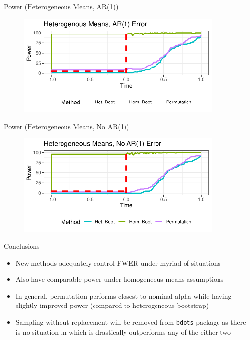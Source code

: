 \documentclass{beamer}
\newcommand{\xt}{\texttt}
\begin{document}
\begin{frame}{Power (Heterogeneous Means, AR(1))}
\begin{figure}
\centering
\includegraphics[width=0.9\textwidth]{type_two_error_time_b.pdf}
\end{figure}
\end{frame}


\begin{frame}{Power (Heterogeneous Means, No AR(1))}
\begin{figure}
\centering
\includegraphics[width=0.9\textwidth]{type_two_error_time_c.pdf}
\end{figure}
\end{frame}



\begin{frame}{Conclusions}

\begin{itemize}
\item New methods adequately control FWER under myriad of situations
\item Also have comparable power under homogeneous means assumptions
\item In general, permutation performs closest to nominal alpha while having slightly improved power (compared to heterogeneous bootstrap)
\item Sampling without replacement will be removed from \xt{bdots} package as there is no situation in which is drastically outperforms any of the either two
\end{itemize}

\end{frame}
\end{document}
